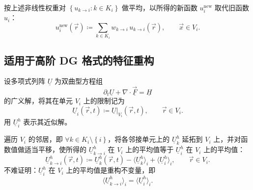 按上述非线性权重对 $\left\{ u_{k\to i}:k\in K_{i}\right\} $ 做平均，以所得的新函数
$u_{i}^{\mathrm{new}}$ 取代旧函数 $u_{i}$：
\begin{equation}
u_{i}^{\mathrm{new}}(\vec{r})\coloneqq\sum_{k\in K_{i}}w_{k\to i}\,u_{k\to i}(\vec{r}),\qquad\vec{x}\in V_{i}.
\end{equation}


\subsection{适用于高阶 DG 格式的特征重构}

设多项式列阵 $\underline{U}$ 为双曲型方程组
\begin{equation}
\partial_{t}\underline{U}+\nabla\cdot\underline{\vec{F}}=\underline{H}\label{eq:hyperbolic_system}
\end{equation}
的广义解，将其在单元 $V_{i}$ 上的限制记为
\begin{equation}
\underline{U}_{i}(\vec{r},t)\coloneqq\underline{U}\vert_{V_{i}}(\vec{r},t),\qquad\vec{r}\in V_{i}.
\end{equation}
用 $\underline{U}_{i}^{h}$ 表示其近似解。

遍历 $V_{i}$ 的邻居，即 $\forall k\in K_{i}\setminus\left\{ i\right\} $，将各邻接单元上的
$\underline{U}_{k}^{h}$ 延拓到 $V_{i}$ 上，并对函数值做适当平移，使所得的 $\underline{U}_{k\to i}^{h}$
在 $V_{i}$ 上的平均值等于 $\underline{U}_{i}^{h}$ 在 $V_{i}$ 上的平均值：
\begin{equation}
\underline{U}_{k\to i}^{h}(\vec{r},t)\coloneqq\underline{U}_{k}^{h}(\vec{r},t)-\langle\underline{U}_{k}^{h}\rangle_{i}+\langle\underline{U}_{i}^{h}\rangle_{i},\qquad\vec{r}\in V_{i}.
\end{equation}
不难证明：$\underline{U}_{i}^{h}$ 在 $V_{i}$ 上的平均值是重构不变量，即
\begin{equation}
\langle\underline{U}_{k\to i}^{h}\rangle_{i}=\langle\underline{U}_{i}^{h}\rangle_{i}.
\end{equation}

